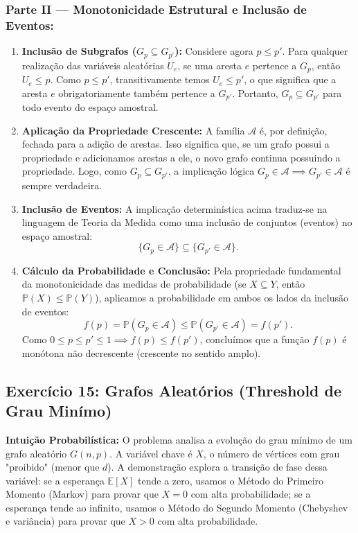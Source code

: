 \documentclass[11pt, a4paper]{article}
\begin{document}
\subsubsection{Parte II --- Monotonicidade Estrutural e Inclusão de Eventos:}
\begin{enumerate}[resume]
    \item \textbf{Inclusão de Subgrafos ($G_p \subseteq G_{p'}$):} Considere agora $p \le p'$. Para qualquer realização das variáveis aleatórias $U_e$, se uma aresta $e$ pertence a $G_p$, então $U_e \le p$. Como $p \le p'$, transitivamente temos $U_e \le p'$, o que significa que a aresta $e$ obrigatoriamente também pertence a $G_{p'}$. Portanto, $G_p \subseteq G_{p'}$ para todo evento do espaço amostral.
    \item \textbf{Aplicação da Propriedade Crescente:} A família $\mathcal{A}$ é, por definição, fechada para a adição de arestas. Isso significa que, se um grafo possui a propriedade e adicionamos arestas a ele, o novo grafo continua possuindo a propriedade. Logo, como $G_p \subseteq G_{p'}$, a implicação lógica $G_p \in \mathcal{A} \implies G_{p'} \in \mathcal{A}$ é sempre verdadeira.
    \item \textbf{Inclusão de Eventos:} A implicação determinística acima traduz-se na linguagem de Teoria da Medida como uma inclusão de conjuntos (eventos) no espaço amostral: 
    \[ \{G_p \in \mathcal{A}\} \subseteq \{G_{p'} \in \mathcal{A}\}. \]
    \item \textbf{Cálculo da Probabilidade e Conclusão:} Pela propriedade fundamental da monotonicidade das medidas de probabilidade (se $X \subseteq Y$, então $\mathbb{P}(X) \le \mathbb{P}(Y)$), aplicamos a probabilidade em ambos os lados da inclusão de eventos:
    \[ f(p) = \mathbb{P}(G_p \in \mathcal{A}) \le \mathbb{P}(G_{p'} \in \mathcal{A}) = f(p'). \]
    Como $0 \le p \le p' \le 1 \implies f(p) \le f(p')$, concluímos que a função $f(p)$ é monótona não decrescente (crescente no sentido amplo).
\end{enumerate}



\subsection*{Exercício 15: Grafos Aleatórios (Threshold de Grau Minímo)}

\textbf{Intuição Probabilística:} O problema analisa a evolução do grau mínimo de um grafo aleatório $G(n,p)$. A variável chave é $X$, o número de vértices com grau "proibido" (menor que $d$). A demonstração explora a transição de fase dessa variável: se a esperança $\mathbb{E}[X]$ tende a zero, usamos o Método do Primeiro Momento (Markov) para provar que $X=0$ com alta probabilidade; se a esperança tende ao infinito, usamos o Método do Segundo Momento (Chebyshev e variância) para provar que $X > 0$ com alta probabilidade.
\end{document}
